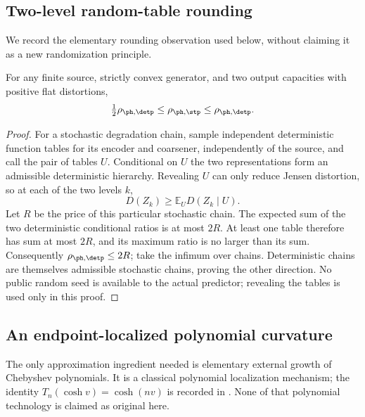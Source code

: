 \subsection{Two-level random-table rounding}
We record the elementary rounding observation used below, without claiming
it as a new randomization principle.
\begin{lemma}
\label{lem:ext-rounding}
For any finite source, strictly convex generator, and two output capacities
with positive flat distortions,
\[
 \tfrac12\rho_{\ph,\detp}\le\rho_{\ph,\stp}
 \le\rho_{\ph,\detp}.
\]
\end{lemma}
\begin{proof}
For a stochastic degradation chain, sample independent deterministic function
tables for its encoder and coarsener, independently of the source, and call
the pair of tables $U$. Conditional on $U$ the two representations form an
admissible deterministic hierarchy. Revealing $U$ can only reduce Jensen
distortion, so at each of the two levels $k$,
\[
 D(Z_k)\ge\mathbb E_U D(Z_k\mid U).
\]
Let $R$ be the price of this particular stochastic chain. The expected sum of
the two deterministic conditional ratios is at most $2R$. At least one table
therefore has sum at most $2R$, and its maximum ratio is no larger than its
sum. Consequently $\rho_{\ph,\detp}\le2R$; take the infimum over chains.
Deterministic chains are themselves admissible stochastic chains, proving the
other direction. No public random seed is available to the actual predictor;
revealing the tables is used only in this proof.
\end{proof}

\subsection{An endpoint-localized polynomial curvature}
The only approximation ingredient needed is elementary external growth of
Chebyshev polynomials. It is a classical polynomial localization mechanism;
the identity $T_n(\cosh v)=\cosh(nv)$ is recorded in
\cite[Eq.~18.5.1]{dlmf}. None of that polynomial technology is claimed as
original here.

